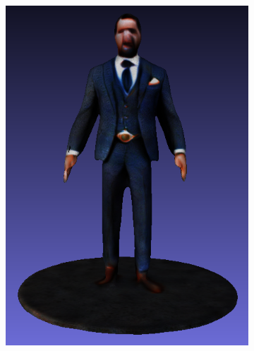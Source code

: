 \begin{figure}[ht]
    \begin{subfigure}[b]{0.218\textwidth}
        \centering
        \includegraphics[width=\textwidth]{etc/bias/bias_rich_genie_1.png}
        \caption{}
    \end{subfigure}
    \begin{subfigure}[b]{0.15\textwidth}
        \centering

\end{subfigure}
\end{figure}
